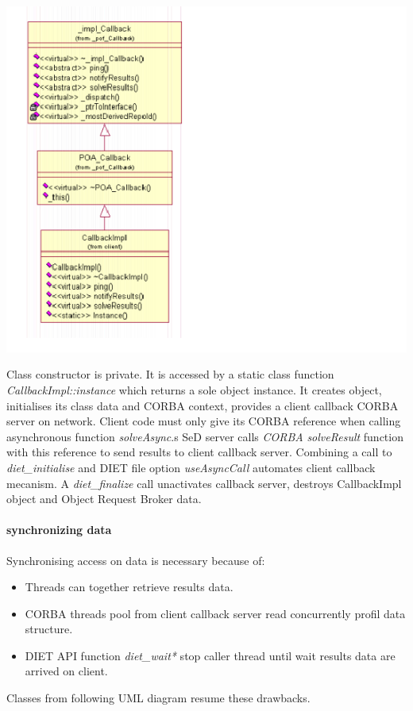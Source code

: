   \includegraphics{./fig/CorbaClientClassDIagram}

  Class constructor is private. It is accessed by a static class function
  \emph{CallbackImpl::instance} which returns a sole object instance. It
  creates object, initialises its class data and CORBA context, provides a
  client callback CORBA server on network.
  Client code must only give its CORBA reference when calling asynchronous
  function \emph{solveAsync}.s
  SeD server calls \emph{CORBA} \emph{solveResult} function with this
  reference to send results to client callback server.
  Combining  a call to \emph{diet\_initialise} and DIET file option
  \emph{useAsyncCall} automates client callback mecanism.
  A \emph{diet\_finalize} call unactivates callback server, destroys
  CallbackImpl object and Object Request Broker data.

  \paragraph{synchronizing data}
  Synchronising access on data is necessary because of:
  \begin{itemize}
  \item Threads can together retrieve results data.
  \item CORBA threads pool from client callback server read concurrently
  profil data structure.
  \item DIET API function \emph{diet\_wait*} stop caller thread until wait
  results data are arrived on client.
  \end{itemize}
  Classes from following UML diagram resume these drawbacks.

